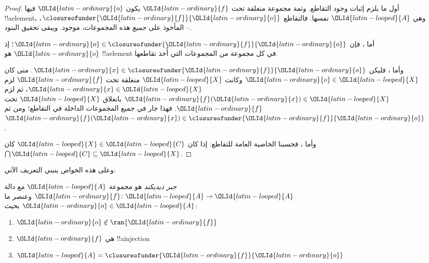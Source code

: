 \documentclass[../../../include/open-logic-section]{subfiles}
\begin{document}
\begin{proof}
أول ما يلزم إثبات وجود التقاطع. وثمة مجموعة منغلقة تحت $\OLId{latin-ordinary}{f}$ يكون $\OLId{latin-ordinary}{o}$ فيها
!!a{element}، وهي $\OLId{latin-looped}{A}$ نفسها. فالتقاطع $\closureofunder{\OLId{latin-ordinary}{f}}{\OLId{latin-ordinary}{o}}$، المأخوذ على
\emph{جميع} هذه المجموعات، موجود. ويبقى تحقيق البنود
--.

أما ، فإن $\OLId{latin-ordinary}{o} \in
\closureofunder{\OLId{latin-ordinary}{f}}{\OLId{latin-ordinary}{o}}$؛ إذ $\OLId{latin-ordinary}{o}$ هو !!a{element} في كل مجموعة من المجموعات التي أُخذ تقاطعها.

وأما ، فليكن $\OLId{latin-ordinary}{x} \in
\closureofunder{\OLId{latin-ordinary}{f}}{\OLId{latin-ordinary}{o}}$. متى كان $\OLId{latin-ordinary}{o} \in \OLId{latin-looped}{X}$ وكانت $\OLId{latin-looped}{X}$ منغلقة تحت $\OLId{latin-ordinary}{f}$ لزم $\OLId{latin-ordinary}{x} \in \OLId{latin-looped}{X}$، ثم لزم $\OLId{latin-ordinary}{f}(\OLId{latin-ordinary}{x}) \in \OLId{latin-looped}{X}$ بانغلاق $\OLId{latin-looped}{X}$ تحت $\OLId{latin-ordinary}{f}$.
فهذا جار في جميع المجموعات الداخلة في التقاطع؛ ومن ثم $\OLId{latin-ordinary}{f}(\OLId{latin-ordinary}{x}) \in \closureofunder{\OLId{latin-ordinary}{f}}{\OLId{latin-ordinary}{o}}$.

وأما ، فحسبنا الخاصية العامة للتقاطع: إذا كان $\OLId{latin-looped}{X}
\in \OLId{latin-looped}{C}$ كان $\bigcap \OLId{latin-looped}{C} \subseteq \OLId{latin-looped}{X}$.
\end{proof}

وعلى هذه الخواص ينبني التعريف الآتي:

\begin{defn}
\emph{جبر ديديكند} هو مجموعة $\OLId{latin-looped}{A}$ مع دالة $\OLId{latin-ordinary}{f}
\colon \OLId{latin-looped}{A} \to \OLId{latin-looped}{A}$ وعنصر ما $\OLId{latin-ordinary}{o} \in \OLId{latin-looped}{A}$ بحيث:
	\begin{enumerate}
		\item {} $\OLId{latin-ordinary}{o} \notin \ran{\OLId{latin-ordinary}{f}}$
		\item {} $\OLId{latin-ordinary}{f}$ هي !!a{injection}
		\item {} $\OLId{latin-looped}{A} = \closureofunder{\OLId{latin-ordinary}{f}}{\OLId{latin-ordinary}{o}}$
	\end{enumerate}
\end{defn}
\end{document}
